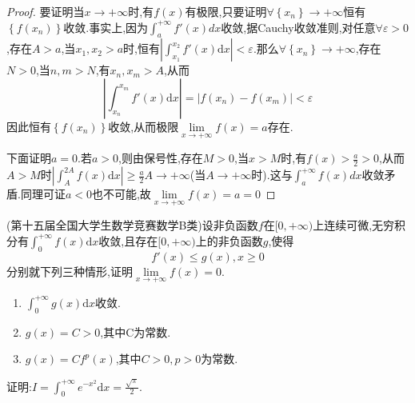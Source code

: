 \begin{proof}
	要证明当$x \rightarrow +\infty$时,有$f(x)$有极限,只要证明$
		\forall \left\{ x_n \right\} \rightarrow +\infty
	$恒有$\left\{f(x_n)\right\}$收敛.事实上,因为$
		\int_a^{+\infty}{f'\left( x \right) dx}
	$收敛,据Cauchy收敛准则,对任意$
		\forall \varepsilon >0
	$,存在$A>a$,当$x_1,x_2>a$时,恒有$
		\left| \int_{x_1}^{x_2}{f'\left( x \right) \text{d}x} \right|<\varepsilon
	$.那么$
		\forall \left\{ x_n \right\} \rightarrow +\infty
	$,存在$N>0$,当$n,m>N$,有$x_n,x_m>A$,从而$$
		\left| \int_{x_n}^{x_m}{f'\left( x \right) \text{d}x} \right|=\left| f\left( x_n \right) -f\left( x_m \right) \right|<\varepsilon
	$$因此恒有$\left\{f(x_n)\right\}$收敛,从而极限$
		\lim\limits_{x\rightarrow +\infty}f\left( x \right) =a
	$存在.

	下面证明$a=0$.若$a>0$,则由保号性,存在$M>0$,当$x>M$时,有$f(x)>\frac{a}{2}>0$,从而$A>M$时$
		\left| \int_A^{2A}{f\left( x \right) \text{d}x} \right|\ge \frac{a}{2}A\rightarrow +\infty
	$(当$A\rightarrow +\infty$时).这与$
		\int_a^{+\infty}{f\left( x \right) dx}
	$收敛矛盾.同理可证$a<0$也不可能,故$
		\lim\limits_{x\rightarrow +\infty}f\left( x \right) =a=0
	$
\end{proof}

\begin{example}
	(第十五届全国大学生数学竞赛数学B类)设非负函数$f$在$[0,+\infty)$上连续可微,无穷积分有$
		\int_{0}^{+\infty}{f\left( x \right) \text{d}x}
	$收敛,且存在$[0,+\infty)$上的非负函数$g$,使得
	$$f'(x) \le g(x),x\ge 0$$
	分别就下列三种情形,证明$
		\lim\limits_{x\rightarrow +\infty}f\left( x \right) =0
	$.
	\begin{enumerate}
		\item $
			      \int_{0}^{+\infty}{g\left( x \right) \text{d}x}
		      $收敛.
		\item $g(x)=C>0$,其中C为常数.
		\item $g(x)=Cf^p (x)$,其中$C>0,p>0$为常数.
	\end{enumerate}
\end{example}

\vspace*{7cm}

\begin{example}
	证明:$I=\int_0^{+\infty}{e^{-x^2}\text{d}x}=\frac{\sqrt{\pi}}{2}$.
\end{example}

